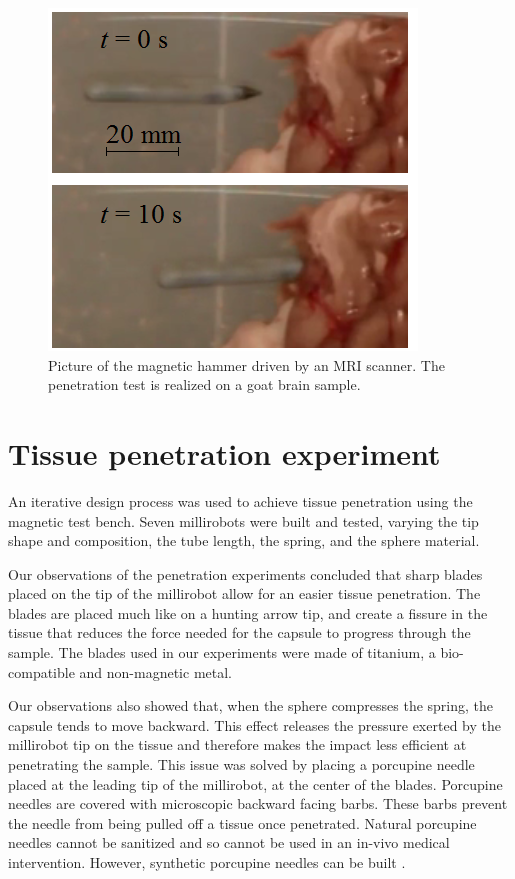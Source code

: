 \documentclass[letterpaper, 10 pt, conference]{ieeeconf}  %
\begin{document}
\begin{figure}
\centering
  \includegraphics[width=120 pt]{tests_in_MRI.png}
  \caption{Picture of the magnetic hammer driven by an MRI scanner. The penetration test is realized on a goat brain sample.}
  \label{MRI_test}
	\vspace{-2em}
\end{figure}

\section{Tissue penetration experiment}

An iterative design process was used to achieve tissue penetration using the magnetic test bench. Seven millirobots were built and tested, varying the tip shape and composition, the tube length, the spring, and the sphere material. \par
Our observations of the penetration experiments concluded that sharp blades placed on the tip of the millirobot allow for an easier tissue penetration. The blades are placed much like on a hunting arrow tip, and create a fissure in the tissue that reduces the force needed for the capsule to progress through the sample. The blades used in our experiments were made of titanium, a bio-compatible and non-magnetic metal.\par
Our observations also showed that, when the sphere compresses the spring, the capsule tends to move backward. This effect releases the pressure exerted by the millirobot tip on the tissue and therefore makes the impact less efficient at penetrating the sample. This issue was solved by placing a porcupine needle placed at the leading tip of the millirobot, at the center of the blades. Porcupine needles are covered with microscopic backward facing barbs. These barbs prevent the needle from being pulled off a tissue once penetrated. Natural porcupine needles cannot be sanitized and so cannot be used in an in-vivo medical intervention. However, synthetic porcupine needles can be built \cite{cho2012microstructured}.\par
\end{document}
